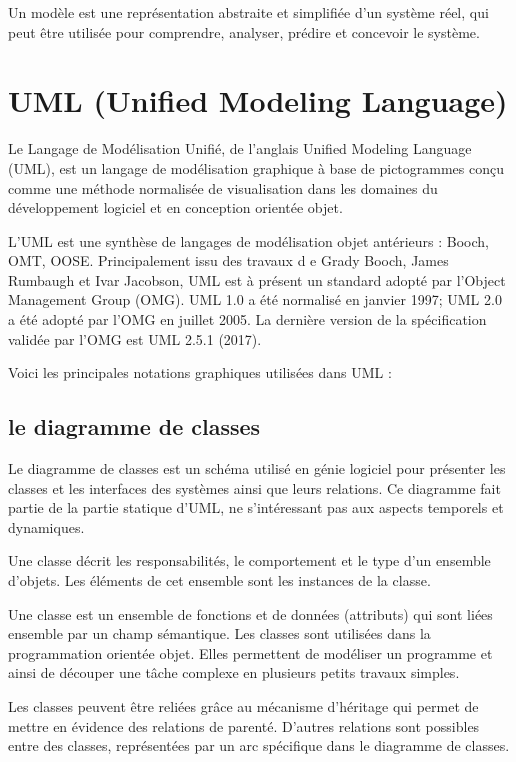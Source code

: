 Un modèle est une représentation abstraite et simplifiée d'un système réel,
qui peut être utilisée pour comprendre, analyser, prédire et concevoir le système.

\section{UML (Unified Modeling Language)}\label{sec:uml}
Le Langage de Modélisation Unifié\cite{uml}, de l'anglais Unified Modeling Language (UML),
est un langage de modélisation graphique à base de pictogrammes conçu comme une méthode
normalisée de visualisation dans les domaines du développement logiciel et en conception orientée objet.

L'UML est une synthèse de langages de modélisation objet antérieurs : Booch, OMT, OOSE. Principalement issu des travaux d
e Grady Booch, James Rumbaugh et Ivar Jacobson, UML est à présent un standard adopté par
l'Object Management Group (OMG). UML 1.0 a été normalisé en janvier 1997; UML 2.0
a été adopté par l'OMG en juillet 2005.
La dernière version de la spécification validée par l'OMG est UML 2.5.1 (2017).

Voici les principales notations graphiques utilisées dans UML :

\subsection{le diagramme de classes}\label{subsec:diagrammes-de-classe}
Le diagramme de classes\cite{diagramme_classes} est un schéma utilisé en génie logiciel pour
présenter les classes et les interfaces des systèmes ainsi que leurs relations.
Ce diagramme fait partie de la partie statique d'UML, ne s'intéressant pas aux aspects
temporels et dynamiques.

Une classe décrit les responsabilités, le comportement et le type d'un ensemble d'objets.
Les éléments de cet ensemble sont les instances de la classe.

Une classe est un ensemble de fonctions et de données (attributs) qui sont
liées ensemble par un champ sémantique. Les classes sont utilisées dans la programmation
orientée objet. Elles permettent de modéliser un programme et ainsi de découper une tâche
complexe en plusieurs petits travaux simples.

Les classes peuvent être reliées grâce au mécanisme d'héritage qui permet de mettre en évidence
des relations de parenté. D'autres relations sont possibles entre des classes, représentées par
un arc spécifique dans le diagramme de classes.

